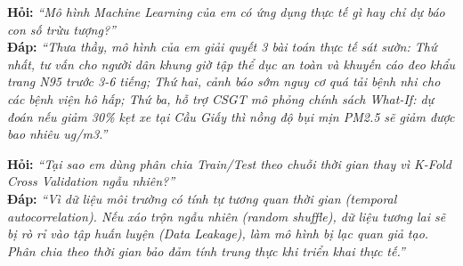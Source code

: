 \documentclass[11pt,a4paper]{article}
\begin{document}
\begin{tcolorbox}[colback=blue!5!white, colframe=blue!60!black, fonttitle=\bfseries\color{white}, title={BỘ CÂU HỎI VẤN ĐÁP TRỌNG TÂM DÀNH CHO TV 6}]
\textbf{Hỏi:} \textit{“Mô hình Machine Learning của em có ứng dụng thực tế gì hay chỉ dự báo con số trừu tượng?”}\\
\textbf{Đáp:} \textit{“Thưa thầy, mô hình của em giải quyết 3 bài toán thực tế sát sườn: Thứ nhất, tư vấn cho người dân khung giờ tập thể dục an toàn và khuyến cáo đeo khẩu trang N95 trước 3-6 tiếng; Thứ hai, cảnh báo sớm nguy cơ quá tải bệnh nhi cho các bệnh viện hô hấp; Thứ ba, hỗ trợ CSGT mô phỏng chính sách What-If: dự đoán nếu giảm 30\% kẹt xe tại Cầu Giấy thì nồng độ bụi mịn PM2.5 sẽ giảm được bao nhiêu ug/m3.”}

\textbf{Hỏi:} \textit{“Tại sao em dùng phân chia Train/Test theo chuỗi thời gian thay vì K-Fold Cross Validation ngẫu nhiên?”}\\
\textbf{Đáp:} \textit{“Vì dữ liệu môi trường có tính tự tương quan thời gian (temporal autocorrelation). Nếu xáo trộn ngẫu nhiên (random shuffle), dữ liệu tương lai sẽ bị rò rỉ vào tập huấn luyện (Data Leakage), làm mô hình bị lạc quan giả tạo. Phân chia theo thời gian bảo đảm tính trung thực khi triển khai thực tế.”}
\end{tcolorbox}

\end{document}
